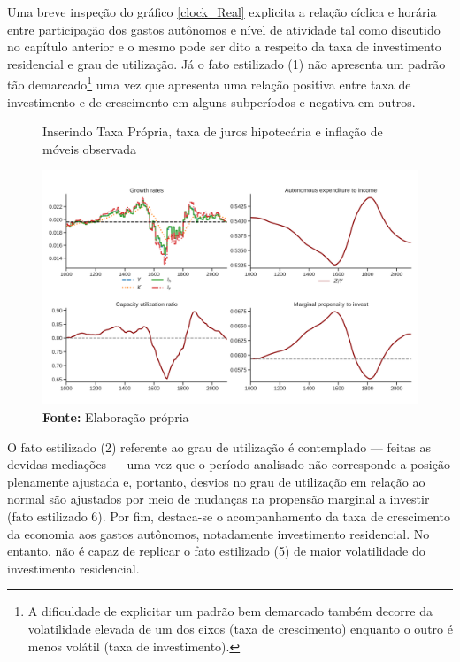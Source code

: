 Uma breve inspeção do gráfico \ref{clock_Real} explicita a relação cíclica e horária entre participação dos gastos autônomos e nível de atividade tal como discutido no capítulo anterior e o mesmo pode ser dito a respeito da taxa de investimento residencial e grau de utilização. Já o fato estilizado (1) não apresenta um padrão tão demarcado\footnote{A dificuldade de explicitar um padrão bem demarcado também decorre da volatilidade elevada de um dos eixos (taxa de crescimento) enquanto o outro é menos volátil (taxa de investimento).} uma vez que apresenta uma relação positiva entre taxa de investimento e de crescimento em alguns subperíodos e negativa em outros.

\begin{figure}[H]
	\centering
	\caption{Inserindo Taxa Própria, taxa de juros hipotecária e inflação de móveis observada}
	\label{choque_Real}
	\includegraphics[width=\textwidth]{../../Modelo/Versoes/Shock_Real.png}
	\caption*{\textbf{Fonte:} Elaboração própria}
\end{figure}


O fato estilizado (2) referente ao grau de utilização é contemplado --- feitas as devidas mediações --- uma vez que o período analisado não corresponde a posição plenamente ajustada e, portanto, desvios no grau de utilização em relação ao normal são ajustados por meio de mudanças na propensão marginal a investir (fato estilizado 6). Por fim, destaca-se o acompanhamento da taxa de crescimento da economia aos gastos autônomos, notadamente investimento residencial. No entanto, não é capaz de replicar o fato estilizado (5) de maior volatilidade do investimento residencial.

